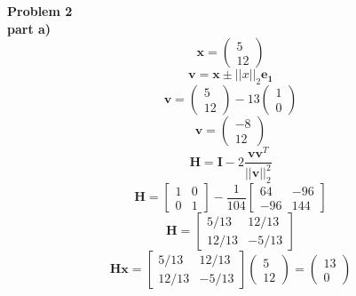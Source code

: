 \documentclass{article} %
\begin{document}
\textbf{Problem 2} \\
\textbf{part a)} \\
\begin{equation}
\boldsymbol{x} = \begin{pmatrix} 5 \\ 12 \end{pmatrix}
\end{equation}
\begin{equation}
\boldsymbol{v}=\boldsymbol{x} \pm||x||_2 \boldsymbol{e_1}
\end{equation} 
\begin{equation}
\boldsymbol{v}=\begin{pmatrix} 5 \\ 12 \end{pmatrix}-13 \begin{pmatrix} 1 \\ 0 \end{pmatrix}
\end{equation} 
\begin{equation}
\boldsymbol{v}=\begin{pmatrix} -8 \\ 12 \end{pmatrix}
\end{equation} 
\begin{equation}
\boldsymbol{H} = \boldsymbol{I} - 2 \frac{\boldsymbol{vv}^T}{||\boldsymbol{v}||_2^2}
\end{equation}
\begin{equation}
\boldsymbol{H} = \begin{bmatrix} 1 & 0 \\ 0 & 1 \end{bmatrix} - \frac{1}{104} \begin{bmatrix} 64 & -96 \\ -96 & 144 \end{bmatrix}
\end{equation}
\begin{equation}
\boldsymbol{H} = \begin{bmatrix} 5/13 & 12/13 \\ 12/13 & -5/13 \end{bmatrix} 
\end{equation}
\begin{equation}
\boldsymbol{H} \boldsymbol{x} = \begin{bmatrix} 5/13 & 12/13 \\ 12/13 & -5/13 \end{bmatrix} \begin{pmatrix} 5 \\ 12 \end{pmatrix} = \begin{pmatrix} 13 \\ 0 \end{pmatrix}
\end{equation}
\end{document}
